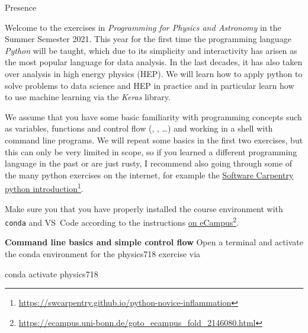 \documentclass[a4paper]{article}
\begin{document}


\begin{exam}[Presence]{Presence}
  \begin{instructions}[Introduction]

    Welcome to the exercises in \emph{Programming for Physics and Astronomy} in
    the Summer Semester 2021. This year for the first time the programming
    language \emph{Python} will be taught, which due to its simplicity and
    interactivity has arisen as the most popular language for data analysis. In
    the last decades, it has also taken over analysis in high energy physics (HEP). We
    will learn how to apply python to solve problems to data science and HEP in
    practice and in particular learn how to use machine learning via the
    \emph{Keras} library.

    We assume that you have some basic familiarity with programming concepts
    such as variables, functions and control flow (,
    , \ldots) and working in a shell with command line programs.
    We will repeat some basics in the first two exercises, but this can only be
    very limited in scope, so if you learned a different programming language in
    the past or are just rusty, I recommend also going through some of the many
    python exercises on the internet, for example the
    \href{https://swcarpentry.github.io/python-novice-inflammation}{Software
      Carpentry python introduction}\footnote{%
      \url{https://swcarpentry.github.io/python-novice-inflammation}}.
  \end{instructions}

  \begin{instructions}

   Make sure you that you have properly installed the course environment with
   \texttt{conda} and VS~Code according to the instructions
   \href{https://ecampus.uni-bonn.de/goto_ecampus_fold_2146080.html}{%
     on eCampus}\footnote{%
     \url{https://ecampus.uni-bonn.de/goto_ecampus_fold_2146080.html}}.

    \begin{problem*}\textbf{Command line basics and simple control flow}
      Open a terminal and activate the conda environment for the physics718
      exercise via

      \begin{bashcode}
        conda activate physics718
      \end{bashcode}


\end{problem*}
\end{instructions}
\end{exam}
\end{document}
